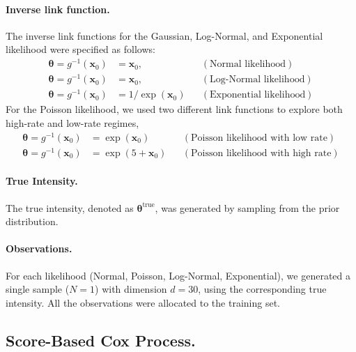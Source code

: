 \paragraph{Inverse link function.} 
The inverse link functions for the Gaussian, Log-Normal, and Exponential likelihood were specified as follows:
\begin{equation*}
\begin{aligned}
     \boldsymbol{\theta} = g^{-1}(\mathbf{x}_0) &= \mathbf{x}_0, &&  (\text{Normal likelihood})\\
    \boldsymbol{\theta} = g^{-1}(\mathbf{x}_0) &= \mathbf{x}_0, &&  (\text{Log-Normal likelihood})\\
    \boldsymbol{\theta} = g^{-1}(\mathbf{x}_0) &= 1 / \exp(\mathbf{x}_0)  && (\text{Exponential likelihood})
\end{aligned}
\end{equation*}
For the Poisson likelihood, we used two different link functions to explore both high-rate and low-rate regimes,
\begin{equation*}
\begin{aligned}
    \boldsymbol{\theta} = g^{-1}(\mathbf{x}_0) &= \exp(\mathbf{x}_0)  && (\text{Poisson likelihood with low rate})\\
    \boldsymbol{\theta} = g^{-1}(\mathbf{x}_0) &= \exp(5 +\mathbf{x}_0) && (\text{Poisson likelihood with high rate})
\end{aligned}
\end{equation*}

\paragraph{True Intensity.} The true intensity, denoted as $\boldsymbol{\theta}^{\text{true}}$, was generated by sampling from the prior distribution.

\paragraph{Observations.} For each likelihood (Normal, Poisson, Log-Normal, Exponential), we generated a single sample ($N = 1$) with dimension $d = 30$, using the corresponding true intensity. All the observations were allocated to the training set.

\subsection{Score-Based Cox Process.}
\label{app-score-based-cox-process-experiment}
